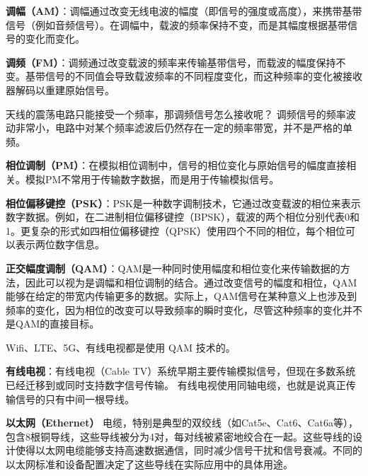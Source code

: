 
\textbf{调幅（AM）}：调幅通过改变无线电波的幅度（即信号的强度或高度），来携带基带信号（例如音频信号）。在调幅中，载波的频率保持不变，而是其幅度根据基带信号的变化而变化。

\textbf{调频（FM）}：调频通过改变载波的频率来传输基带信号，而载波的幅度保持不变。基带信号的不同值会导致载波频率的不同程度变化，而这种频率的变化被接收器解码以重建原始信号。

天线的震荡电路只能接受一个频率，那调频信号怎么接收呢？ 调频信号的频率波动非常小，电路中对某个频率滤波后仍然存在一定的频率带宽，并不是严格的单频。

\textbf{相位调制（PM）}：在模拟相位调制中，信号的相位变化与原始信号的幅度直接相关。模拟PM不常用于传输数字数据，而是用于传输模拟信号。

\textbf{相位偏移键控（PSK）}：PSK是一种数字调制技术，它通过改变载波的相位来表示数字数据。例如，在二进制相位偏移键控（BPSK），载波的两个相位分别代表0和1。更复杂的形式如四相位偏移键控（QPSK）使用四个不同的相位，每个相位可以表示两位数字信息。

\textbf{正交幅度调制（QAM）}：QAM是一种同时使用幅度和相位变化来传输数据的方法，因此可以视为是调幅和相位调制的结合。通过改变信号的幅度和相位，QAM能够在给定的带宽内传输更多的数据。实际上，QAM信号在某种意义上也涉及到频率的变化，因为相位的改变可以导致频率的瞬时变化，尽管这种频率的变化并不是QAM的直接目标。

Wifi、LTE、5G、有线电视都是使用 QAM 技术的。

\textbf{有线电视}：有线电视（Cable TV）系统早期主要传输模拟信号，但现在多数系统已经迁移到或同时支持数字信号传输。 有线电视使用同轴电缆，也就是说真正传输信号的只有中间一根导线。

\textbf{以太网（Ethernet）} 电缆，特别是典型的双绞线（如Cat5e、Cat6、Cat6a等），包含8根铜导线，这些导线被分为4对，每对线被紧密地绞合在一起。这些导线的设计使得以太网电缆能够支持高速数据通信，同时减少信号干扰和信号衰减。不同的以太网标准和设备配置决定了这些导线在实际应用中的具体用途。
